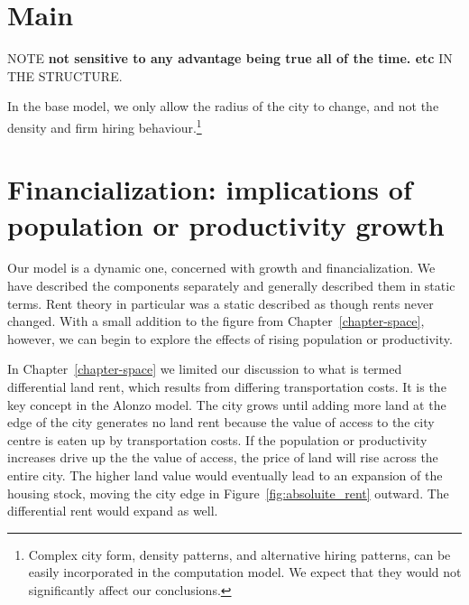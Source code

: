     


\section{Main}



NOTE \textbf{not sensitive to any advantage being true all of the time. etc } IN THE STRUCTURE.


In the base model, we only allow the radius of the city to change, and not the density and firm hiring behaviour.\footnote{Complex city form, density patterns, and alternative hiring patterns, can be easily incorporated in the computation model. We expect that they would not significantly affect our conclusions.}  



\section{Financialization: implications of  population or productivity growth}

Our model is a dynamic  one, concerned with growth and financialization. We have described the components separately and  generally described them in static terms. Rent theory in  particular was a static described as though rents never changed. With a small addition to the figure from Chapter~\ref{chapter-space}, however, we can begin to explore the effects of rising population or productivity. 

In Chapter~\ref{chapter-space} we limited our discussion to what is termed differential land rent, which results from differing transportation costs. It is the key concept in the Alonzo model. The city grows until adding more land at the edge of the city generates no land rent because the value of access to the city centre is eaten up by transportation costs. If the population or productivity increases   drive up the the value of access, the price of land  will rise across the entire city. The higher land value would eventually lead to an expansion of the housing stock, moving the city edge in Figure~\ref{fig:absoluite_rent} outward. The differential rent would expand as well.

